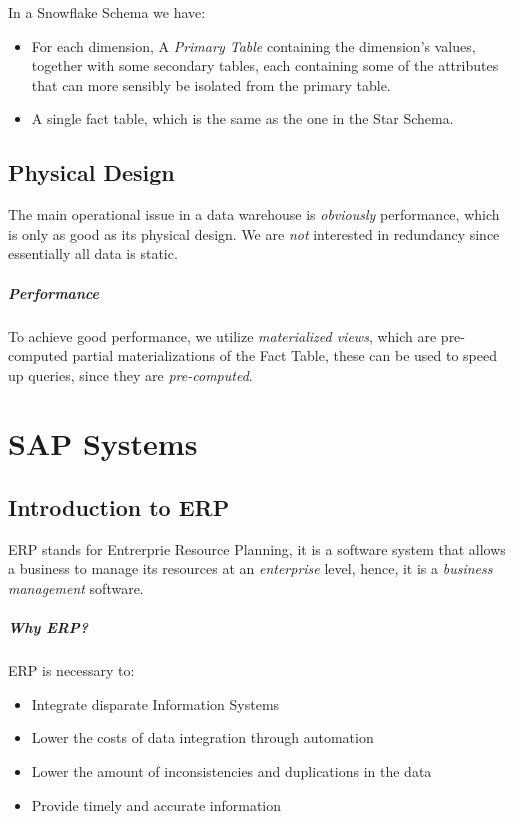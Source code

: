 \documentclass[openright, twoside, twocolumn, a4paper, 10pt]{report}
\begin{document}
In a Snowflake Schema we have:

\begin{itemize}
	\item For each dimension, A \emph{Primary Table} containing the dimension's values,
	      together with some secondary tables, each containing some of the attributes that
	      can more sensibly be isolated from the primary table.
	\item A single fact table, which is the same as the one in the Star Schema.
\end{itemize}

\section{Physical Design}

The main operational issue in a data warehouse is \emph{obviously} performance,
which is only as good as its physical design. We are \emph{not} interested in
redundancy since essentially all data is static.

\paragraph{Performance}
To achieve good performance, we utilize \emph{materialized views}, which are
pre-computed partial materializations of the Fact Table, these
can be used to speed up queries, since they are \emph{pre-computed}.

\chapter{SAP Systems}

\section{Introduction to ERP}
ERP stands for Entrerprie Resource Planning, it is a software system that
allows a business to manage its resources at an \emph{enterprise} level, hence,
it is a \emph{business management} software.

\paragraph{Why ERP?}
ERP is necessary to:

\begin{itemize}
	\item Integrate disparate Information Systems
	\item Lower the costs of data integration through automation
	\item Lower the amount of inconsistencies and duplications in the data
	\item Provide timely and accurate information
\end{itemize}
\end{document}

